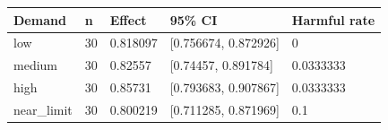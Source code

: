 \begin{tabular}{lllll}
\hline
Demand & n & Effect & 95\% CI & Harmful rate \\
\hline
low & 30 & 0.818097 & [0.756674, 0.872926] & 0 \\
medium & 30 & 0.82557 & [0.74457, 0.891784] & 0.0333333 \\
high & 30 & 0.85731 & [0.793683, 0.907867] & 0.0333333 \\
near\_limit & 30 & 0.800219 & [0.711285, 0.871969] & 0.1 \\
\hline
\end{tabular}

